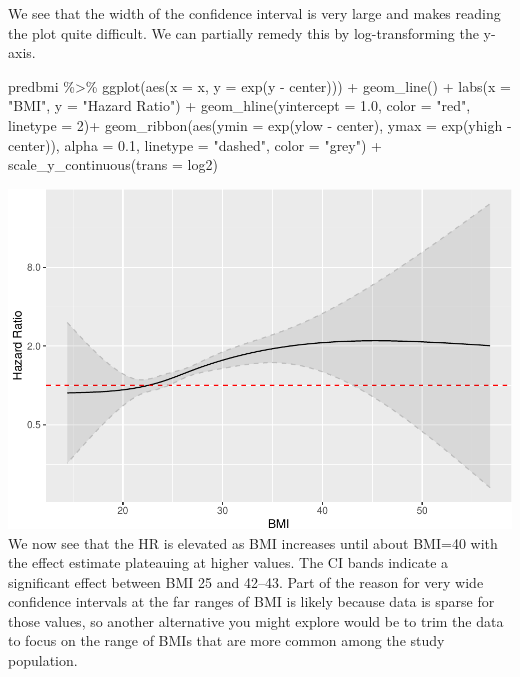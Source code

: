 \documentclass[
]{book}
\newenvironment{Shaded}{\begin{snugshade}}{\end{snugshade}}
\newcommand{\AttributeTok}[1]{\textcolor[rgb]{0.77,0.63,0.00}{#1}}
\newcommand{\DecValTok}[1]{\textcolor[rgb]{0.00,0.00,0.81}{#1}}
\newcommand{\FloatTok}[1]{\textcolor[rgb]{0.00,0.00,0.81}{#1}}
\newcommand{\FunctionTok}[1]{\textcolor[rgb]{0.00,0.00,0.00}{#1}}
\newcommand{\NormalTok}[1]{#1}
\newcommand{\SpecialCharTok}[1]{\textcolor[rgb]{0.00,0.00,0.00}{#1}}
\newcommand{\StringTok}[1]{\textcolor[rgb]{0.31,0.60,0.02}{#1}}
\begin{document}
We see that the width of the confidence interval is very large and makes reading the plot quite difficult. We can partially remedy this by log-transforming the y-axis.

\begin{Shaded}
\begin{Highlighting}[]
\NormalTok{predbmi }\SpecialCharTok{\%\textgreater{}\%}
  \FunctionTok{ggplot}\NormalTok{(}\FunctionTok{aes}\NormalTok{(}\AttributeTok{x =}\NormalTok{ x, }\AttributeTok{y =} \FunctionTok{exp}\NormalTok{(y }\SpecialCharTok{{-}}\NormalTok{ center))) }\SpecialCharTok{+} 
  \FunctionTok{geom\_line}\NormalTok{() }\SpecialCharTok{+}
  \FunctionTok{labs}\NormalTok{(}\AttributeTok{x =} \StringTok{"BMI"}\NormalTok{, }
       \AttributeTok{y =} \StringTok{"Hazard Ratio"}\NormalTok{) }\SpecialCharTok{+} 
  \FunctionTok{geom\_hline}\NormalTok{(}\AttributeTok{yintercept =} \FloatTok{1.0}\NormalTok{, }\AttributeTok{color =} \StringTok{"red"}\NormalTok{, }\AttributeTok{linetype =} \DecValTok{2}\NormalTok{)}\SpecialCharTok{+}
  \FunctionTok{geom\_ribbon}\NormalTok{(}\FunctionTok{aes}\NormalTok{(}\AttributeTok{ymin =} \FunctionTok{exp}\NormalTok{(ylow }\SpecialCharTok{{-}}\NormalTok{ center), }\AttributeTok{ymax =} \FunctionTok{exp}\NormalTok{(yhigh }\SpecialCharTok{{-}}\NormalTok{ center)), }
              \AttributeTok{alpha =} \FloatTok{0.1}\NormalTok{, }
              \AttributeTok{linetype =} \StringTok{"dashed"}\NormalTok{,}
              \AttributeTok{color =} \StringTok{"grey"}\NormalTok{) }\SpecialCharTok{+}
  \FunctionTok{scale\_y\_continuous}\NormalTok{(}\AttributeTok{trans =} \StringTok{\textquotesingle{}log2\textquotesingle{}}\NormalTok{) }
\end{Highlighting}
\end{Shaded}

\includegraphics{adv_epi_analysis_files/figure-latex/unnamed-chunk-246-1.pdf}
We now see that the HR is elevated as BMI increases until about BMI=40 with the effect estimate plateauing at higher values. The CI bands indicate a significant effect between BMI 25 and 42--43. Part of the reason for very wide confidence intervals at the far ranges of BMI is likely because data is sparse for those values, so another alternative you might explore would be to trim the data to focus on the range of BMIs that are more common among the study population.
\end{document}
